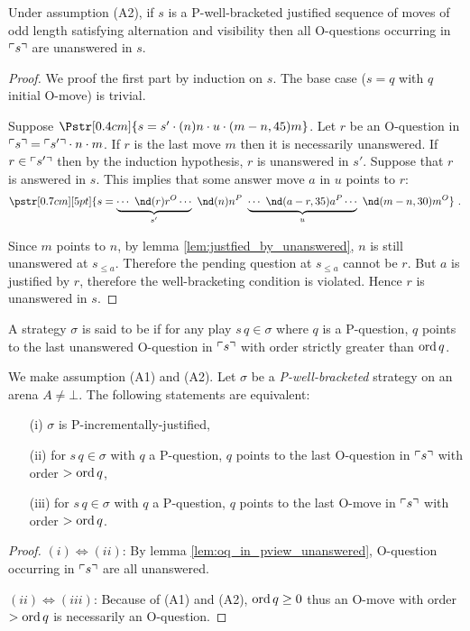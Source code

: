 \begin{lemma}
\label{lem:oq_in_pview_unanswered}
Under assumption (A2), if $s$ is a P-well-bracketed justified sequence of moves of odd length satisfying alternation and visibility then  all O-questions occurring in $\ulcorner s \urcorner$ are unanswered in $s$.
\end{lemma}
\begin{proof}
We proof the first part by induction on $s$.
The base case ($s = q$ with $q$ initial O-move) is trivial.

Suppose $\Pstr[0.4cm]{ s = s' \cdot (n)n \cdot u \cdot (m-n,45){m} }$.
Let $r$ be an O-question in $\ulcorner s \urcorner = \ulcorner s' \urcorner \cdot n \cdot m$.
If $r$ is the last move $m$ then it is necessarily unanswered.
If $r \in \ulcorner s' \urcorner$ then by the induction hypothesis, $r$ is unanswered in $s'$.
Suppose that $r$ is answered in $s$. This implies that some answer move $a$ in $u$ points to $r$:
$$\pstr[0.7cm][5pt]{ s = \underbrace{\cdots\ \nd(r){r}^O \cdots }_{s'} \
\nd(n){n}^P \ \underbrace{\cdots\ \nd(a-r,35){a}^P \cdots }_{u} \
\nd(m-n,30){m}^O } \ .$$
 
Since $m$ points to $n$, by lemma \ref{lem:justfied_by_unanswered}, $n$ is still unanswered at $s_{\leq a}$. Therefore the pending
question at $s_{\leq a}$ cannot be $r$. But $a$ is justified by $r$, therefore the well-bracketing condition is violated. Hence $r$ is
unanswered in $s$.
\end{proof}





\begin{definition}\rm
  A strategy $\sigma$ is said to be \defname{P-incrementally
    justified} if for any play $s \, q \in \sigma$ where $q$ is a
  P-question, $q$ points to the last unanswered O-question in $\ulcorner s \urcorner$ with
  order strictly greater than $\mathop{\mathrm{ord}}{q}$.
\end{definition}

\begin{proposition}
\label{prop:char_pincr}
\rm We make assumption (A1) and (A2).
Let $\sigma$ be a \emph{P-well-bracketed} strategy on an arena $A\neq \bot$.
The following statements are equivalent:
\begin{enumerate}
\item[(i)] $\sigma$ is P-incrementally-justified,
\item[(ii)] for $s \, q \in \sigma$ with $q$ a P-question, $q$ points to the last O-question in $\ulcorner s \urcorner$ with order $>\mathop{\mathrm{ord}}{q}$,
\item[(iii)] for $s \, q \in \sigma$ with $q$ a P-question, $q$ points to the last O-move in $\ulcorner s \urcorner$ with order $>\mathop{\mathrm{ord}}{q}$.
\end{enumerate}
\end{proposition}
\begin{proof}
$(i)\iff(ii)$: By lemma \ref{lem:oq_in_pview_unanswered}, O-question occurring in $\ulcorner s \urcorner$ are all unanswered.

$(ii)\iff(iii)$: Because of (A1) and (A2), $\mathop{\mathrm{ord}}{q} \geq 0$ thus an O-move with order $>\mathop{\mathrm{ord}}{q}$ is necessarily an O-question.
\end{proof}

